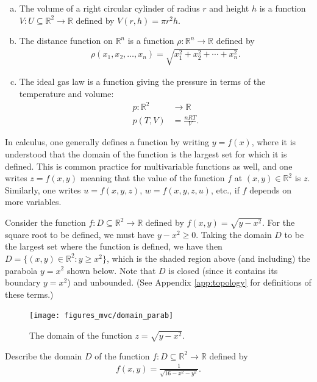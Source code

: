 \documentclass[12pt,letterpaper,reqno]{article}
\numberwithin{equation}{section}
\newcommand{\R}{\ensuremath{\mathbb R}}
\begin{document}
{\begin{example}
\begin{enumerate}[(a)]
	\item The volume of a right circular cylinder of radius $r$ and height $h$ is a function $V:U \subseteq \R^2 \to \R$ defined by $V(r,h)=\pi r^2h$.
	\item The distance function on $\R^n$ is a function $\rho:\R^n \to \R$ defined by
	\begin{align*}
	\rho(x_1,x_2,\dots,x_n)=\sqrt{x_1^2+x_2^2+\cdots+x_n^2}.
	\end{align*}
	\item The ideal gas law is a function giving the pressure in terms of the temperature and volume:
	\begin{align*} 
		p:\R^2 &\to \R\\
		p(T,V)&=\frac{nRT}{V}.
	\end{align*}
\end{enumerate}	
\end{example}
In calculus, one generally defines a function by writing $y=f(x)$, where it is understood that the domain of the function is the largest set for which it is defined. This is common practice for multivariable functions as well, and one writes $z=f(x,y)$ meaning that the value of the function $f$ at $(x,y) \in \R^2$ is $z$. Similarly, one writes $u=f(x,y,z)$, $w=f(x,y,z,u)$, etc., if $f$ depends on more variables.

\begin{example}\label{ex:parab_blue}
Consider the function $f:D \subseteq \R^2 \to \R$ defined by $f(x,y)=\sqrt{y-x^2}$. For the square root to be defined, we must have $y-x^2\geq 0$. Taking the domain $D$ to be the largest set where the function is defined, we have then $D=\{(x,y) \in \R^2:y \geq x^2\}$, which is the shaded region above (and including) the parabola $y=x^2$ shown below. Note that $D$ is closed (since it contains its boundary $y=x^2$) and unbounded. (See Appendix \ref{app:topology} for definitions of these terms.)
\begin{figure}[h]
	\begin{center}
		\texttt{[image: figures\_mvc/domain\_parab]}
	\end{center}
	\caption{The domain of the function $z=\sqrt{y-x^2}$.}
\end{figure}
\end{example}

\begin{exercise}\label{exer:green_circ}
Describe the domain $D$ of the function $f:D \subseteq \R^2 \to \R$ defined by 
\begin{align*}
	f(x,y)=\frac{1}{\sqrt{16-x^2-y^2}}.
\end{align*}	
\end{exercise}

}
\end{document}
